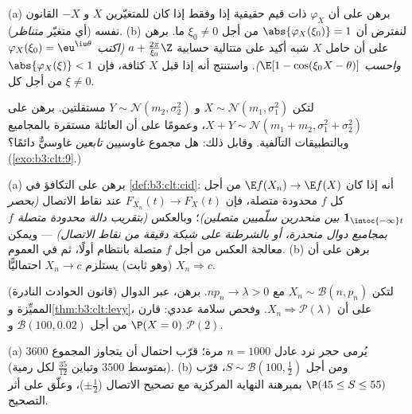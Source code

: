 \begin{exercise}[$\star\star$]\label{exo:b3:clt:2}
(a) برهن على أن $\varphi_X$ ذات قيم حقيقية إذا وفقط إذا كان
للمتغيّرين $X$ و $-X$ القانون نفسه (أي متغيّر \emph{متناظر}).
(b) لنفترض أن $\abs{\varphi_X(\xi_0)} = 1$ من أجل $\xi_0 \neq
0$ ما. برهن على أن حامل $X$
شبه أكيد على متتالية حسابية $a + \frac{2\pi}{\xi_0}\Z$ \emph{(اكتب $\varphi_X(\xi_0) = \eu^{\iu\theta}$ واحسب
$\E[1 -
\cos(\xi_0X - \theta)]$)}. واستنتج أنه إذا قبل $X$ كثافة، فإن $\abs{\varphi_X(\xi)} < 1$ من
أجل كل $\xi \neq 0$.
\end{exercise}

\begin{exercise}[$\star\star$]\label{exo:b3:clt:3}
لتكن $X \sim \mathcal N(m_1, \sigma_1^2)$ و $Y \sim
\mathcal N(m_2, \sigma_2^2)$ مستقلتين. برهن على $X + Y
\sim \mathcal N(m_1 + m_2, \sigma_1^2 + \sigma_2^2)$، وعمومًا على
أن العائلة  مستقرة بالمجاميع  وبالتطبيقات
التآلفية. وقابل ذلك: هل مجموع غاوسيين \emph{تابعين} غاوسيٌّ
دائمًا؟ (\cref{exo:b3:clt:9}.)
\end{exercise}

\begin{exercise}[$\star\star$]\label{exo:b3:clt:4}
(a) برهن على التكافؤ في \cref{def:b3:clt:cid}: أنه إذا كان $\E f(X_n) \to \E f(X)$ من أجل
كل $f$ محدودة متصلة، فإن $F_{X_n}(t) \to F_X(t)$ عند نقاط الاتصال \emph{(بحصر
$\mathbf 1_{\intoc{-\infty}t}$ بين منحدرين سلّميين متصلين)}؛ وبالعكس \emph{(بتقريب
دالة محدودة متصلة $f$ بمجاميع دوال منحدرة، أو بالشرطنة على
شبكة دقيقة من نقاط الاتصال)} --- ويمكن معالجة العكس من أجل $f$
متصلة بانتظام أولًا، ثم في العموم.
(b) برهن على أن $X_n \Rightarrow c$ (وهو ثابت) يستلزم $X_n
\to c$ احتماليًّا.
\end{exercise}

\begin{exercise}[$\star\star$]\label{exo:b3:clt:5}
(قانون الحوادث النادرة) لتكن $X_n \sim \mathcal B(n, p_n)$ مع $np_n \to \lambda > 0$. برهن، عبر
الدوال المميِّزة و\cref{thm:b3:clt:levy}، على أن $X_n \Rightarrow \mathcal
P(\lambda)$. وفحص سلامة عددي:
قارن $\P(X = 0)$ من أجل $\mathcal B(100, 0.02)$ و $\mathcal P(2)$.
\end{exercise}

\begin{exercise}[$\star\star$]\label{exo:b3:clt:6}
(a) يُرمى حجر نرد عادل $n = 1000$ مرة؛ قرّب احتمال أن يتجاوز
المجموع $3600$ (بمتوسط $3500$ وتباين $\frac{35}{12}$ لكل
رمية).
(b) ومن أجل $S \sim \mathcal B(100, \frac12)$، قرّب $\P(45 \leq S \leq 55)$ بمبرهنة النهاية المركزية مع
تصحيح الاتصال ($\pm\frac12$)، وعلّق على أثر التصحيح.
\end{exercise}

